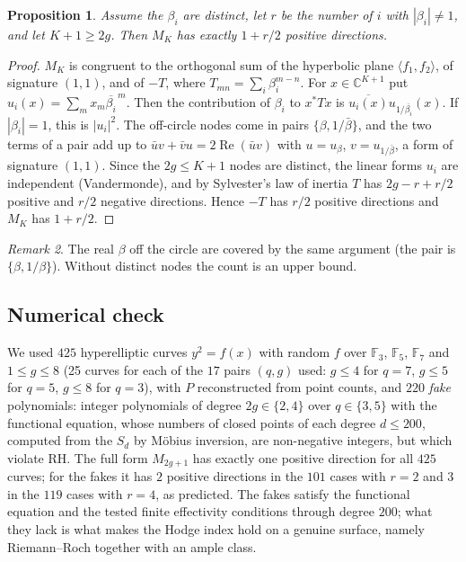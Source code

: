 \documentclass[11pt]{amsart}
\newtheorem{proposition}{Proposition}[section]
\theoremstyle{remark}
\newtheorem{remark}[proposition]{Remark}
\theoremstyle{definition}
\renewcommand{\Re}{\operatorname{Re}}
\newcommand{\F}{\mathbb F}
\begin{document}
\begin{proposition}\label{prop:inertia}
Assume the $\beta_i$ are distinct, let $r$ be the number of $i$ with $|\beta_i|\ne1$, and let $K+1\ge2g$. Then $M_K$ has exactly $1+r/2$ positive directions.
\end{proposition}
\begin{proof}
$M_K$ is congruent to the orthogonal sum of the hyperbolic plane $\langle f_1,f_2\rangle$, of signature $(1,1)$, and of $-T$, where $T_{mn}=\sum_i\beta_i^{m-n}$. For $x\in\mathbb C^{K+1}$ put $u_i(x)=\sum_mx_m\overline{\beta_i}^{\,m}$. Then the contribution of $\beta_i$ to $x^*Tx$ is $\overline{u_i(x)}u_{1/\overline{\beta_i}}(x)$. If $|\beta_i|=1$, this is $|u_i|^2$. The off-circle nodes come in pairs $\{\beta,1/\bar\beta\}$, and the two terms of a pair add up to $\bar u v+\bar v u=2\Re(\bar u v)$ with $u=u_\beta$, $v=u_{1/\bar\beta}$, a form of signature $(1,1)$. Since the $2g\le K+1$ nodes are distinct, the linear forms $u_i$ are independent (Vandermonde), and by Sylvester's law of inertia $T$ has $2g-r+r/2$ positive and $r/2$ negative directions. Hence $-T$ has $r/2$ positive directions and $M_K$ has $1+r/2$.
\end{proof}

\begin{remark}
The real $\beta$ off the circle are covered by the same argument (the pair is $\{\beta,1/\beta\}$). Without distinct nodes the count is an upper bound.
\end{remark}

\subsection*{Numerical check} We used $425$ hyperelliptic curves $y^2=f(x)$ with random $f$ over $\F_3$, $\F_5$, $\F_7$ and $1\le g\le8$ (25 curves for each of the $17$ pairs $(q,g)$ used: $g\le4$ for $q=7$, $g\le5$ for $q=5$, $g\le8$ for $q=3$), with $P$ reconstructed from point counts, and $220$ \emph{fake} polynomials: integer polynomials of degree $2g\in\{2,4\}$ over $q\in\{3,5\}$ with the functional equation, whose numbers of closed points of each degree $d\le200$, computed from the $S_d$ by M\"obius inversion, are non-negative integers, but which violate RH. The full form $M_{2g+1}$ has exactly one positive direction for all $425$ curves; for the fakes it has $2$ positive directions in the $101$ cases with $r=2$ and $3$ in the $119$ cases with $r=4$, as predicted. The fakes satisfy the functional equation and the tested finite effectivity conditions through degree $200$; what they lack is what makes the Hodge index hold on a genuine surface, namely Riemann--Roch together with an ample class.
\end{document}
